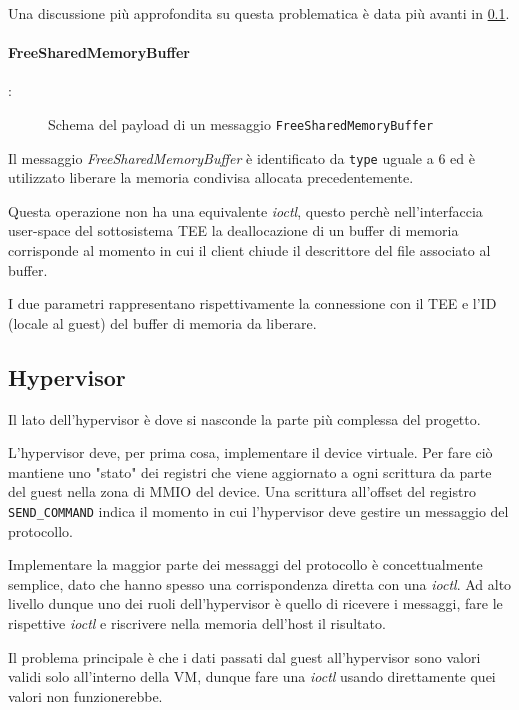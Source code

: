\documentclass[12pt,italian]{report}
\begin{document}
Una discussione più approfondita su questa problematica è data più avanti in
\ref{subsection:hypervisor}.

\paragraph{FreeSharedMemoryBuffer}: \\
\begin{figure}[H]
    \centering
    \caption{Schema del payload di un messaggio \texttt{FreeSharedMemoryBuffer}}
    \label{fig:msg-schema-freebuf}
\end{figure}
Il messaggio \textit{FreeSharedMemoryBuffer} è identificato da \texttt{type}
uguale a $6$ ed è utilizzato liberare la memoria condivisa allocata
precedentemente.

Questa operazione non ha una equivalente \textit{ioctl}, questo perchè
nell'interfaccia user-space del sottosistema TEE la deallocazione di un
buffer di memoria corrisponde al momento in cui il client chiude il
descrittore del file associato al buffer.

I due parametri rappresentano rispettivamente la connessione con il TEE
e l'ID (locale al guest) del buffer di memoria da liberare.

\subsection{Hypervisor}
\label{subsection:hypervisor}
Il lato dell'hypervisor è dove si nasconde la parte più complessa del progetto.

L'hypervisor deve, per prima cosa, implementare il device virtuale.
Per fare ciò mantiene uno "stato" dei registri che viene aggiornato a ogni
scrittura da parte del guest nella zona di MMIO del device.
Una scrittura all'offset del registro \texttt{SEND\_COMMAND} indica il momento
in cui l'hypervisor deve gestire un messaggio del protocollo.

Implementare la maggior parte dei messaggi del protocollo è concettualmente
semplice, dato che hanno spesso una corrispondenza diretta con una
\textit{ioctl}.
Ad alto livello dunque uno dei ruoli dell'hypervisor è quello di ricevere
i messaggi, fare le rispettive \textit{ioctl} e riscrivere nella memoria
dell'host il risultato.

Il problema principale è che i dati passati dal guest all'hypervisor sono
valori validi solo all'interno della VM, dunque fare una \textit{ioctl}
usando direttamente quei valori non funzionerebbe.
\end{document}
